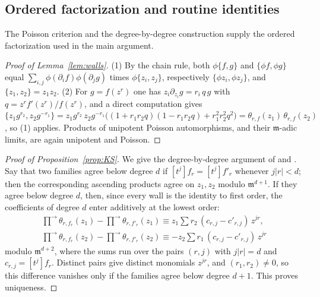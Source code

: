 \documentclass[11pt]{article}
\theoremstyle{definition}
\theoremstyle{remark}
\numberwithin{equation}{section}
\newcommand{\m}{\mathfrak{m}}
\newcommand{\asc}{\textstyle\prod^{\rightarrow}}
\begin{document}
\begin{appendices}
\section{Ordered factorization and routine identities}\label{sec:factor-details}
The Poisson criterion and the degree-by-degree construction supply the
ordered factorization used in the main argument.

\begin{proof}[Proof of Lemma~\ref{lem:walls}]
(1) By the chain rule, both $\phi\{f,g\}$ and $\{\phi f,\phi g\}$ equal
$\sum_{i,j}\phi(\partial_if)\phi(\partial_jg)$ times $\phi\{z_i,z_j\}$,
respectively $\{\phi z_i,\phi z_j\}$, and $\{z_1,z_2\}=z_1z_2$. (2) For
$g=f(z^r)$ one has $z_i\partial_{z_i}g=r_i\,q\,g$ with
$q=z^rf'(z^r)/f(z^r)$, and a direct computation gives
$\{z_1g^{r_2},z_2g^{-r_1}\}=z_1g^{r_2}\,z_2g^{-r_1}\big((1+r_1r_2q)(1-r_1r_2q)+r_1^2r_2^2q^2\big)=\theta_{r,f}(z_1)\,\theta_{r,f}(z_2)$,
so (1) applies. Products of unipotent Poisson automorphisms, and their
$\m$-adic limits, are again unipotent and Poisson.
\end{proof}
\begin{proof}[Proof of Proposition~\ref{prop:KS}]
We give the degree-by-degree argument of \cite{KS06} and
\cite[\S1.3]{GPS}. Say that two families agree below degree $d$ if
$[t^j]f_r=[t^j]f'_r$ whenever $j|r|<d$; then the corresponding ascending
products agree on $z_1,z_2$ modulo $\m^{d+1}$. If they agree below degree
$d$, then, since every wall is the identity to first order, the
coefficients of degree $d$ enter additively at the lowest order:
\begin{gather*}
  \asc\theta_{r,f_r}(z_1)-\asc\theta_{r,f'_r}(z_1)\equiv z_1\textstyle\sum r_2\,(c_{r,j}-c'_{r,j})\,z^{jr},\\
  \asc\theta_{r,f_r}(z_2)-\asc\theta_{r,f'_r}(z_2)\equiv -z_2\textstyle\sum r_1\,(c_{r,j}-c'_{r,j})\,z^{jr}
\end{gather*}
modulo $\m^{d+2}$, where the sums run over the pairs $(r,j)$ with
$j|r|=d$ and $c_{r,j}=[t^j]f_r$. Distinct pairs give distinct monomials
$z^{jr}$, and $(r_1,r_2)\neq0$, so this difference vanishes only if the
families agree below degree $d+1$. This proves uniqueness.


\end{proof}
\end{appendices}
\end{document}
